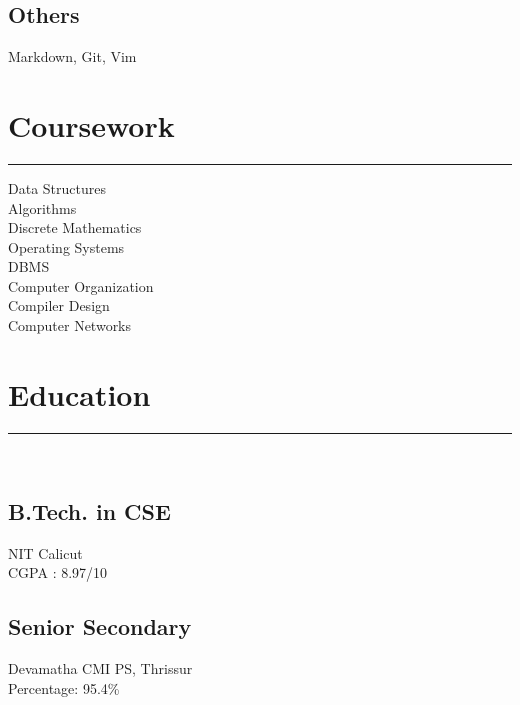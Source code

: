 \documentclass[]{resume}
\begin{document}
\begin{minipage}[t]{0.33\textwidth}
\subsection{Others}
Markdown, Git, Vim
\sectionsep
\section{Coursework}
\noindent\rule{5cm}{0.8pt}

Data Structures\\
Algorithms\\
Discrete Mathematics\\
Operating Systems\\
DBMS\\
Computer Organization\\
Compiler Design\\
Computer Networks
\sectionsep
\section{Education} 
\noindent\rule{5cm}{0.8pt}\\
\subsection{B.Tech. in CSE}
NIT Calicut \\
CGPA : 8.97/10\\
\vspace{8pt}
\subsection{Senior Secondary}
Devamatha CMI PS, Thrissur\\
Percentage: 95.4\%\\
\vspace{8pt}

\sectionsep
%
%

\end{minipage} 
\hfill
\end{document}
